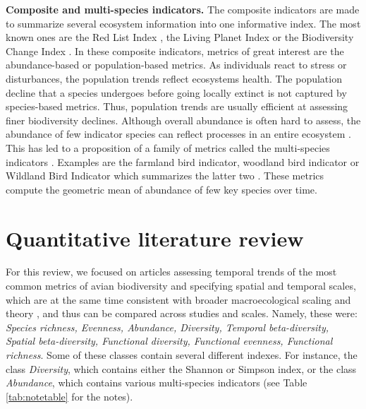 \documentclass[
  12pt,
  oneside]{report}
\begin{document}
\textbf{Composite and multi-species indicators.} The composite indicators are made to summarize several ecosystem information into one informative index. The most known ones are the Red List Index \autocite{butchart_improvements_2007,butchart_measuring_2004,butchart_using_2005}, the Living Planet Index \autocite{loh_living_2005} or the Biodiversity Change Index \autocite{normander_indicator_2012}. In these composite indicators, metrics of great interest are the abundance-based or population-based metrics. As individuals react to stress or disturbances, the population trends reflect ecosystems health. The population decline that a species undergoes before going locally extinct is not captured by species-based metrics. Thus, population trends are usually efficient at assessing finer biodiversity declines. Although overall abundance is often hard to assess, the abundance of few indicator species can reflect processes in an entire ecosystem \autocite{gregory_developing_2005}. This has led to a proposition of a family of metrics called the multi-species indicators \autocite[MSI,][]{landres_ecological_1988}. Examples are the farmland bird indicator, woodland bird indicator or Wildland Bird Indicator which summarizes the latter two \autocite{gregory_generation_1999,gregory_wild_2010}. These metrics compute the geometric mean of abundance of few key species over time.

\hypertarget{quantitative-literature-review}{%
\chapter{Quantitative literature review}\label{quantitative-literature-review}}

For this review, we focused on articles assessing temporal trends of the most common metrics of avian biodiversity and specifying spatial and temporal scales, which are at the same time consistent with broader macroecological scaling and theory \autocite{storch_scaling_2007,storch_untangling_2004}, and thus can be compared across studies and scales. Namely, these were: \emph{Species richness, Evenness, Abundance, Diversity, Temporal beta-diversity, Spatial beta-diversity, Functional diversity, Functional evenness, Functional richness}. Some of these classes contain several different indexes. For instance, the class \emph{Diversity}, which contains either the Shannon or Simpson index, or the class \emph{Abundance}, which contains various multi-species indicators (see Table \ref{tab:notetable} for the notes).
\end{document}
